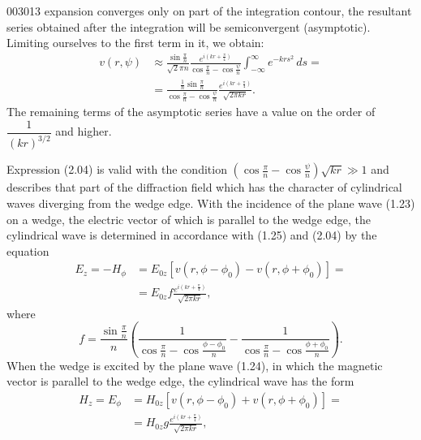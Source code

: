 \begin{scanpage}{0030}{13}
expansion converges only on part of the integration contour, the resultant series obtained after the integration will be semiconvergent (asymptotic). Limiting ourselves to the first term in it, we obtain:
\[\begin{aligned}v(r,\psi)&\approx\frac{\sin\frac\pi n}{\sqrt2\pi n}\frac{e^{i(kr+\frac\pi4)}}{\cos\frac\pi n-\cos\frac\psi n}\int_{-\infty}^{\infty}e^{-krs^2}\,ds=\\&=\frac{\frac1n\sin\frac\pi n}{\cos\frac\pi n-\cos\frac\psi n}\frac{e^{i(kr+\frac\pi4)}}{\sqrt{2\pi kr}}.\end{aligned}\tag{2.04}\]
The remaining terms of the asymptotic series have a value on the order of $\dfrac1{(kr)^{3/2}}$ and higher.

Expression (2.04) is valid with the condition $\left(\cos\frac\pi n-\cos\frac\psi n\right)\sqrt{kr}\gg1$ and describes that part of the diffraction field which has the character of cylindrical waves diverging from the wedge edge. With the incidence of the plane wave (1.23) on a wedge, the electric vector of which is parallel to the wedge edge, the cylindrical wave is determined in accordance with (1.25) and (2.04) by the equation
\[\begin{aligned}E_z=-H_\phi&=E_{0z}[v(r,\phi-\phi_0)-v(r,\phi+\phi_0)]=\\&=E_{0z}f\frac{e^{i(kr+\frac\pi4)}}{\sqrt{2\pi kr}},\end{aligned}\tag{2.05}\]
where
\[f=\frac{\sin\frac\pi n}{n}\left(\frac1{\cos\frac\pi n-\cos\frac{\phi-\phi_0}{n}}-\frac1{\cos\frac\pi n-\cos\frac{\phi+\phi_0}{n}}\right).\tag{2.06}\]
When the wedge is excited by the plane wave (1.24), in which the magnetic vector is parallel to the wedge edge, the cylindrical wave has the form
\[\begin{aligned}H_z=E_\phi&=H_{0z}[v(r,\phi-\phi_0)+v(r,\phi+\phi_0)]=\\&=H_{0z}g\frac{e^{i(kr+\frac\pi4)}}{\sqrt{2\pi kr}},\end{aligned}\tag{2.07}\]
\end{scanpage}
